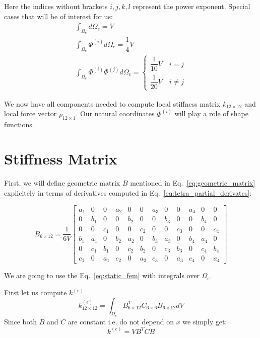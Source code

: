 \documentclass[en]{minipw} %
\begin{document}
Here the indices without brackets $i,j,k,l$ represent the power exponent.
Special cases that will be of interest for us:
\begin{equation}
\label{eq:anal_intergral}
\begin{aligned}
\int_{\Omega_{e}} d \Omega_{e} = V
\\
\int_{\Omega_{e}} \Phi^{(i)} d \Omega_{e} = \dfrac{1}{4}V
\\
\int_{\Omega_{e}} \Phi^{(i)} \Phi^{(j)} d \Omega_{e} = 
\begin{cases}
\dfrac{1}{10} V \quad i = j 
\\
\dfrac{1}{20} V \quad i \neq j
\end{cases}
\end{aligned}
\end{equation}

We now have all components needed to compute local stiffness matrix $k_{12 \times 12}$ and local force vector $p_{12 \times 1}$. Our natural coordinates $\Phi^{(i)}$ will play a role of shape functions.

\section{Stiffness Matrix}

First, we will define geometric matrix $B$ mentioned in Eq.~\ref{eq:geometric_matrix} explicitely in terms of derivatives computed in Eq.~\ref{eq:tetra_partial_derivates}:

\begin{equation}
B_{6 \times 12} = \dfrac{1}{6V}
\begin{bmatrix}
a_1 & 0 & 0 & a_2 & 0 & 0 & a_3 & 0 & 0 & a_4 & 0 & 0 \\
0 & b_1 & 0 & 0 & b_2 & 0 & 0 & b_3 & 0 & 0 & b_4 & 0 \\
0 & 0 & c_1 & 0 & 0 & c_2 & 0 & 0 & c_3 & 0 & 0 & c_4 \\
b_1 & a_1 & 0 & b_2 & a_2 & 0 & b_3 & a_3 & 0 & b_4 & a_4 & 0 \\
0 & c_1 & b_1 & 0 & c_2 & b_2 & 0 & c_3 & b_3 & 0 & c_4 & b_4 \\
c_1 & 0 & a_1 & c_2 & 0 & a_2 & c_3 & 0 & a_3 & c_4 & 0 & a_4
\end{bmatrix}
\end{equation}

We are going to use the Eq.~\ref{eq:static_fem} with integrals over $\Omega_{e}$. 

First let us compute $k^{(e)}$
\begin{equation}
k^{(e)}_{12 \times 12} = \int_{\Omega_{e}} B^{T}_{6 \times 12} C_{6 \times 6} B_{6 \times 12} dV 
\end{equation}
Since both $B$ and $C$ are constant i.e. do not depend on $x$ we simply get:
\begin{equation}
k^{(e)} = V B^{T} C B 
\end{equation}
\end{document}
